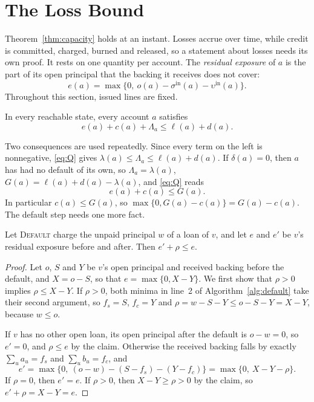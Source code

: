 \documentclass[acmsmall,nonacm,screen]{acmart}
\theoremstyle{acmdefinition}%
\newcommand{\sigin}{\sigma^{\mathrm{in}}}
\newcommand{\upsin}{\upsilon^{\mathrm{in}}}
\newcommand{\Op}[1]{\textsc{#1}}
\begin{document}
\section{The Loss Bound}\label{sec:loss}

Theorem~\ref{thm:capacity} holds at an instant. Losses accrue over time, while credit is
committed, charged, burned and released, so a statement about losses needs its own proof. It rests
on one quantity per account. The \emph{residual exposure} of $a$ is the part of its open principal
that the backing it receives does not cover:
\[
  e(a)=\max\bigl\{0,\ o(a)-\sigin(a)-\upsin(a)\bigr\}.
\]
Throughout this section, issued lines are fixed.

\begin{lemma}\label{lem:Q}
In every reachable state, every account $a$ satisfies
\begin{equation}\label{eq:Q}
  e(a)+c(a)+\Lambda_a\le\ell(a)+d(a).\tag{Q}
\end{equation}
\end{lemma}

Two consequences are used repeatedly. Since every term on the left is nonnegative,
\eqref{eq:Q} gives $\lambda(a)\le\Lambda_a\le\ell(a)+d(a)$. If $\delta(a)=0$, then $a$ has had no
default of its own, so $\Lambda_a=\lambda(a)$, $G(a)=\ell(a)+d(a)-\lambda(a)$, and \eqref{eq:Q}
reads
\begin{equation}\label{eq:Qlive}
  e(a)+c(a)\le G(a).
\end{equation}
In particular $c(a)\le G(a)$, so $\max\{0,G(a)-c(a)\}=G(a)-c(a)$. The default step needs one more
fact.

\begin{lemma}\label{lem:residual}
Let \Op{Default} charge the unpaid principal $w$ of a loan of $v$, and let $e$ and $e'$ be $v$'s
residual exposure before and after. Then $e'+\rho\le e$.
\end{lemma}

\begin{proof}
Let $o$, $S$ and $Y$ be $v$'s open principal and received backing before the default, and
$X=o-S$, so that $e=\max\{0,X-Y\}$. We first show that $\rho>0$ implies $\rho\le X-Y$. If
$\rho>0$, both minima in line~2 of Algorithm~\ref{alg:default} take their second argument, so
$f_s=S$, $f_c=Y$ and $\rho=w-S-Y\le o-S-Y=X-Y$, because $w\le o$.

If $v$ has no other open loan, its open principal after the default is $o-w=0$, so $e'=0$, and
$\rho\le e$ by the claim. Otherwise the received backing falls by exactly $\sum_ua_u=f_s$ and
$\sum_ub_u=f_c$, and
\[
  e'=\max\bigl\{0,\ (o-w)-(S-f_s)-(Y-f_c)\bigr\}=\max\{0,\ X-Y-\rho\}.
\]
If $\rho=0$, then $e'=e$. If $\rho>0$, then $X-Y\ge\rho>0$ by the claim, so
$e'+\rho=X-Y=e$.
\end{proof}
\end{document}
